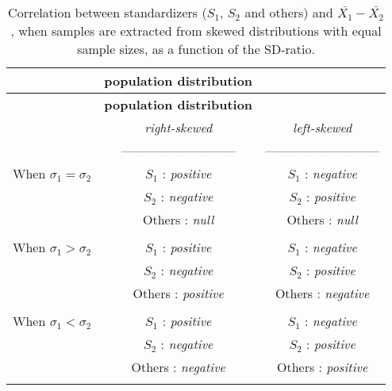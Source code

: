 \documentclass[
  english,
  man,mask,floatsintext]{apa6}
\begin{document}
\begin{longtable}[]{@{}lcc@{}}
\caption{Correlation between standardizers (\(S_1\), \(S_2\) and others) and \(\bar{X_1}-\bar{X_2}\), when samples are extracted from skewed distributions with equal sample sizes, as a function of the SD-ratio.}\tabularnewline
\toprule
& \textbf{\textbf{population distribution}} & \\
\midrule
\endfirsthead
\toprule
& \textbf{\textbf{population distribution}} & \\
\midrule
\endhead
& \emph{right-skewed} & \emph{left-skewed} \\
& --------------------------- & --------------------------- \\
When \(\sigma_1=\sigma_2\) & \(S_1\) : \emph{positive} & \(S_1\) : \emph{negative} \\
& \(S_2\) : \emph{negative} & \(S_2\) : \emph{positive} \\
& Others : \emph{null} & Others : \emph{null} \\
& & \\
When \(\sigma_1>\sigma_2\) & \(S_1\) : \emph{positive} & \(S_1\) : \emph{negative} \\
& \(S_2\) : \emph{negative} & \(S_2\) : \emph{positive} \\
& Others : \emph{positive} & Others : \emph{negative} \\
& & \\
When \(\sigma_1<\sigma_2\) & \(S_1\) : \emph{positive} & \(S_1\) : \emph{negative} \\
& \(S_2\) : \emph{negative} & \(S_2\) : \emph{positive} \\
& Others : \emph{negative} & Others : \emph{positive} \\
& & \\
\bottomrule
\end{longtable}
\end{document}
